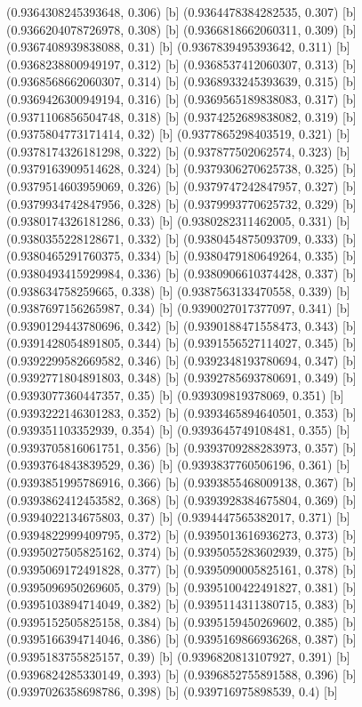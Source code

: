{{{(0.9364308245393648, 0.306) [b] 
(0.9364478384282535, 0.307) [b] 
(0.9366204078726978, 0.308) [b] 
(0.9366818662060311, 0.309) [b] 
(0.9367408939838088, 0.31) [b] 
(0.9367839495393642, 0.311) [b] 
(0.9368238800949197, 0.312) [b] 
(0.9368537412060307, 0.313) [b] 
(0.9368568662060307, 0.314) [b] 
(0.9368933245393639, 0.315) [b] 
(0.9369426300949194, 0.316) [b] 
(0.9369565189838083, 0.317) [b] 
(0.9371106856504748, 0.318) [b] 
(0.9374252689838082, 0.319) [b] 
(0.9375804773171414, 0.32) [b] 
(0.9377865298403519, 0.321) [b] 
(0.9378174326181298, 0.322) [b] 
(0.937877502062574, 0.323) [b] 
(0.9379163909514628, 0.324) [b] 
(0.9379306270625738, 0.325) [b] 
(0.9379514603959069, 0.326) [b] 
(0.9379747242847957, 0.327) [b] 
(0.9379934742847956, 0.328) [b] 
(0.9379993770625732, 0.329) [b] 
(0.9380174326181286, 0.33) [b] 
(0.9380282311462005, 0.331) [b] 
(0.9380355228128671, 0.332) [b] 
(0.9380454875093709, 0.333) [b] 
(0.9380465291760375, 0.334) [b] 
(0.9380479180649264, 0.335) [b] 
(0.9380493415929984, 0.336) [b] 
(0.9380906610374428, 0.337) [b] 
(0.938634758259665, 0.338) [b] 
(0.9387563133470558, 0.339) [b] 
(0.9387697156265987, 0.34) [b] 
(0.9390027017377097, 0.341) [b] 
(0.9390129443780696, 0.342) [b] 
(0.9390188471558473, 0.343) [b] 
(0.9391428054891805, 0.344) [b] 
(0.9391556527114027, 0.345) [b] 
(0.9392299582669582, 0.346) [b] 
(0.9392348193780694, 0.347) [b] 
(0.9392771804891803, 0.348) [b] 
(0.9392785693780691, 0.349) [b] 
(0.9393077360447357, 0.35) [b] 
(0.939309819378069, 0.351) [b] 
(0.9393222146301283, 0.352) [b] 
(0.9393465894640501, 0.353) [b] 
(0.939351103352939, 0.354) [b] 
(0.9393645749108481, 0.355) [b] 
(0.9393705816061751, 0.356) [b] 
(0.9393709288283973, 0.357) [b] 
(0.9393764843839529, 0.36) [b] 
(0.9393837760506196, 0.361) [b] 
(0.9393851995786916, 0.366) [b] 
(0.9393855468009138, 0.367) [b] 
(0.9393862412453582, 0.368) [b] 
(0.9393928384675804, 0.369) [b] 
(0.9394022134675803, 0.37) [b] 
(0.9394447565382017, 0.371) [b] 
(0.9394822999409795, 0.372) [b] 
(0.9395013616936273, 0.373) [b] 
(0.9395027505825162, 0.374) [b] 
(0.9395055283602939, 0.375) [b] 
(0.9395069172491828, 0.377) [b] 
(0.9395090005825161, 0.378) [b] 
(0.9395096950269605, 0.379) [b] 
(0.9395100422491827, 0.381) [b] 
(0.9395103894714049, 0.382) [b] 
(0.9395114311380715, 0.383) [b] 
(0.9395152505825158, 0.384) [b] 
(0.9395159450269602, 0.385) [b] 
(0.9395166394714046, 0.386) [b] 
(0.9395169866936268, 0.387) [b] 
(0.9395183755825157, 0.39) [b] 
(0.9396820813107927, 0.391) [b] 
(0.9396824285330149, 0.393) [b] 
(0.9396852755891588, 0.396) [b] 
(0.9397026358698786, 0.398) [b] 
(0.939716975898539, 0.4) [b] 
}}}
